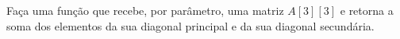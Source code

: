 
\question[10]

Faça uma função que recebe, por parâmetro, uma matriz $A[3][3]$ e retorna a soma dos elementos da sua diagonal principal e da sua diagonal secundária.